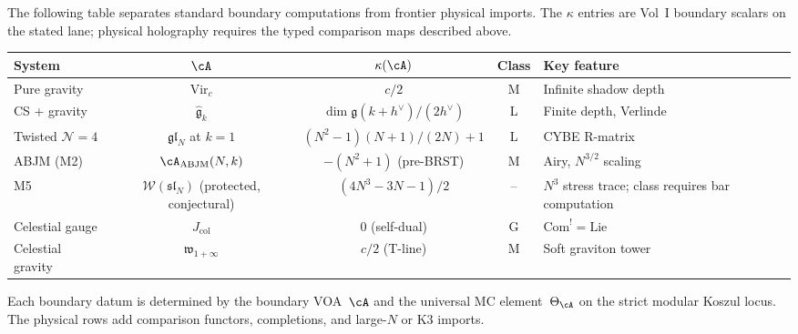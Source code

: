 \begin{remark}
\label{rem:frontier-holographic-datum-table}
The following table separates standard boundary computations from
frontier physical imports. The $\kappa$ entries are Vol~I boundary
scalars on the stated lane; physical holography requires the typed
comparison maps described above.
\begin{center}
\renewcommand{\arraystretch}{1.25}
\small
\begin{tabular}{@{}l@{\;\;}c@{\;\;}c@{\;\;}c@{\;\;}l@{}}
\textbf{System} & $\cA$ & $\kappa(\cA)$
 & \textbf{Class} & \textbf{Key feature} \\
\midrule
Pure gravity
 & $\mathrm{Vir}_c$
 & $c/2$ & M
 & Infinite shadow depth \\
CS + gravity
 & $\widehat{\mathfrak{g}}_k$
 & $\dim\mathfrak{g}(k{+}h^\vee)/(2h^\vee)$
 & L
 & Finite depth, Verlinde \\
Twisted $\mathcal{N}{=}4$
 & $\mathfrak{gl}_N$ at $k{=}1$
 & $(N^2{-}1)(N{+}1)/(2N)+1$
 & L
 & CYBE R-matrix \\
ABJM (M2)
 & $\cA_{\mathrm{ABJM}}(N,k)$
 & $-(N^2{+}1)$ \textup{(pre-BRST)}
 & M
 & Airy, $N^{3/2}$ scaling \\
M5
 & $\mathcal W(\mathfrak{sl}_N)$ \textup{(protected, conjectural)}
 & $(4N^3{-}3N{-}1)/2$
 & --
 & $N^3$ stress trace; class requires bar computation \\
Celestial gauge
 & $J_{\mathrm{col}}$
 & $0$ (self-dual)
 & G
 & $\mathrm{Com}^! = \mathrm{Lie}$ \\
Celestial gravity
 & $\mathfrak{w}_{1+\infty}$
 & $c/2$ (T-line)
 & M
 & Soft graviton tower
\end{tabular}
\end{center}
Each boundary datum is determined by the boundary VOA~$\cA$ and the
universal MC element~$\Theta_\cA$ on the strict modular Koszul locus.
The physical rows add comparison functors, completions, and large-$N$
or K3 imports.
\end{remark}

